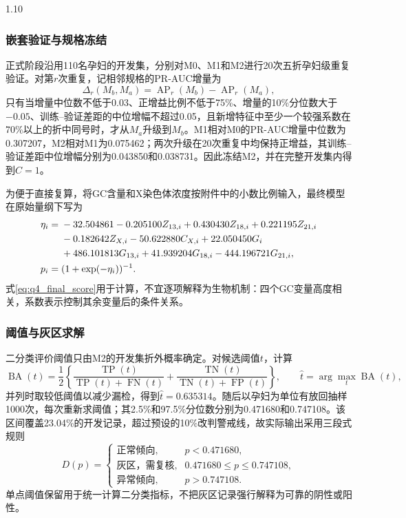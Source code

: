 \documentclass[12pt,a4paper]{ctexrep}
\numberwithin{equation}{section}
\begin{document}
\begin{spacing}{1.10}
{			\subsubsection{嵌套验证与规格冻结}
			正式阶段沿用110名孕妇的开发集，分别对M0、M1和M2进行20次五折孕妇级重复验证。对第$r$次重复，记相邻规格的PR-AUC增量为
			\begin{equation}
			\Delta_r(M_b,M_a)=\operatorname{AP}_r(M_b)-\operatorname{AP}_r(M_a),
			\label{eq:q4_spec_increment}
			\end{equation}
			只有当增量中位数不低于0.03、正增益比例不低于75\%、增量的10\%分位数大于$-0.05$、训练--验证差距的中位增幅不超过0.05，且新增特征中至少一个较强系数在70\%以上的折中同号时，才从$M_a$升级到$M_b$。M1相对M0的PR-AUC增量中位数为0.307207，M2相对M1为0.075462；两次升级在20次重复中均保持正增益，其训练--验证差距中位增幅分别为0.043850和0.038731。因此冻结M2，并在完整开发集内得到$C=1$。

			为便于直接复算，将GC含量和X染色体浓度按附件中的小数比例输入，最终模型在原始量纲下写为
			\begin{align}
			\eta_i={}&-32.504861-0.205100Z_{13,i}+0.430430Z_{18,i}
			+0.221195Z_{21,i}\notag\\
			&-0.182642Z_{X,i}-50.622880C_{X,i}+22.050450G_i\notag\\
			&+486.101813G_{13,i}+41.939204G_{18,i}
			-444.196721G_{21,i},\label{eq:q4_final_score}\\
			p_i={}&(1+\exp(-\eta_i))^{-1}.
			\label{eq:q4_final_probability}
			\end{align}
			式\eqref{eq:q4_final_score}用于计算，不宜逐项解释为生物机制：四个GC变量高度相关，系数表示控制其余变量后的条件关系。

			\subsubsection{阈值与灰区求解}
			二分类评价阈值只由M2的开发集折外概率确定。对候选阈值$t$，计算
			\begin{equation}
			\operatorname{BA}(t)=\frac{1}{2}\left\{\frac{\operatorname{TP}(t)}{\operatorname{TP}(t)+\operatorname{FN}(t)}
			+\frac{\operatorname{TN}(t)}{\operatorname{TN}(t)+\operatorname{FP}(t)}\right\},
			\qquad \widehat{t}=\arg\max_t\operatorname{BA}(t),
			\label{eq:q4_threshold}
			\end{equation}
			并列时取较低阈值以减少漏检，得到$\widehat{t}=0.635314$。随后以孕妇为单位有放回抽样1000次，每次重新求阈值；其2.5\%和97.5\%分位数分别为0.471680和0.747108。该区间覆盖23.04\%的开发记录，超过预设的10\%改判警戒线，故实际输出采用三段式规则
			\begin{equation}
			D(p)=
			\begin{cases}
			\text{正常倾向}, & p<0.471680,\\
			\text{灰区，需复核}, & 0.471680\le p\le0.747108,\\
			\text{异常倾向}, & p>0.747108.
			\end{cases}
			\label{eq:q4_three_way_rule}
			\end{equation}
			单点阈值保留用于统一计算二分类指标，不把灰区记录强行解释为可靠的阴性或阳性。
			
}
\end{spacing}
\end{document}
